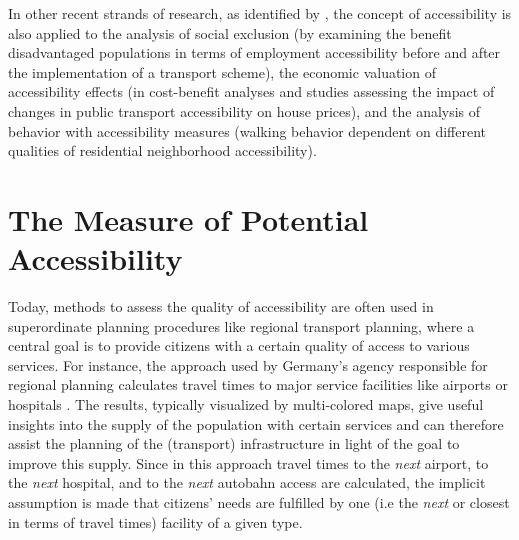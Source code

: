 In other recent strands of research, as identified by \citet{GeursEtAl2012AccessibilityTransportIntroduction}, the concept of 
accessibility is also applied to the analysis of social exclusion (\eg by examining the benefit 
disadvantaged populations in terms of employment accessibility before and after the implementation of a transport scheme), 
the economic valuation of accessibility effects (\eg in cost-benefit analyses and studies assessing the impact of changes in 
public transport accessibility on house prices), and the analysis of behavior with accessibility measures (\eg walking behavior 
dependent on different qualities of residential neighborhood accessibility).






\section{The Measure of Potential Accessibility} 
Today, methods to assess the quality of accessibility are often used in superordinate planning procedures like 
regional transport planning, where a central goal is to provide 
citizens with a certain quality of access to various services. For instance, the approach used by Germany's agency 
responsible for regional planning calculates travel times to major service facilities like airports or hospitals \citep{BBSR20xxErreichbarkeitsmodell}. The results, typically visualized by multi-colored maps, give useful insights 
into the supply of the population with certain services and can therefore assist the planning of the (transport) 
infrastructure in light of the goal to improve this supply.
Since in this approach travel times to the \textit{next} airport, to the \textit{next} hospital, and to the \textit{next} 
autobahn access are calculated, the implicit assumption is made that citizens' needs are fulfilled by one (i.e the \textit{next} 
or closest in terms of travel times) facility of a given type.


